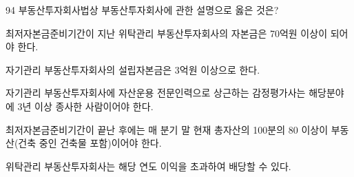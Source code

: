\begin{question}{94}
부동산투자회사법상 부동산투자회사에 관한 설명으로 옳은 것은?
\begin{choices}
  \item 최저자본금준비기간이 지난 위탁관리 부동산투자회사의 자본금은 70억원 이상이 되어야 한다.
  \item 자기관리 부동산투자회사의 설립자본금은 3억원 이상으로 한다.
  \item 자기관리 부동산투자회사에 자산운용 전문인력으로 상근하는 감정평가사는 해당분야에 3년 이상 종사한 사람이어야 한다.
  \item 최저자본금준비기간이 끝난 후에는 매 분기 말 현재 총자산의 100분의 80 이상이 부동산(건축 중인 건축물 포함)이어야 한다.
  \item 위탁관리 부동산투자회사는 해당 연도 이익을 초과하여 배당할 수 있다.
\end{choices}
\end{question}
